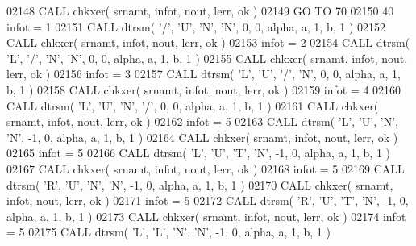 \begin{DoxyCode}
02148       \textcolor{keyword}{CALL }chkxer( srnamt, infot, nout, lerr, ok )
02149       \textcolor{keywordflow}{GO TO} 70
02150    40 infot = 1
02151       \textcolor{keyword}{CALL }dtrsm( \textcolor{stringliteral}{'/'}, \textcolor{stringliteral}{'U'}, \textcolor{stringliteral}{'N'}, \textcolor{stringliteral}{'N'}, 0, 0, alpha, a, 1, b, 1 )
02152       \textcolor{keyword}{CALL }chkxer( srnamt, infot, nout, lerr, ok )
02153       infot = 2
02154       \textcolor{keyword}{CALL }dtrsm( \textcolor{stringliteral}{'L'}, \textcolor{stringliteral}{'/'}, \textcolor{stringliteral}{'N'}, \textcolor{stringliteral}{'N'}, 0, 0, alpha, a, 1, b, 1 )
02155       \textcolor{keyword}{CALL }chkxer( srnamt, infot, nout, lerr, ok )
02156       infot = 3
02157       \textcolor{keyword}{CALL }dtrsm( \textcolor{stringliteral}{'L'}, \textcolor{stringliteral}{'U'}, \textcolor{stringliteral}{'/'}, \textcolor{stringliteral}{'N'}, 0, 0, alpha, a, 1, b, 1 )
02158       \textcolor{keyword}{CALL }chkxer( srnamt, infot, nout, lerr, ok )
02159       infot = 4
02160       \textcolor{keyword}{CALL }dtrsm( \textcolor{stringliteral}{'L'}, \textcolor{stringliteral}{'U'}, \textcolor{stringliteral}{'N'}, \textcolor{stringliteral}{'/'}, 0, 0, alpha, a, 1, b, 1 )
02161       \textcolor{keyword}{CALL }chkxer( srnamt, infot, nout, lerr, ok )
02162       infot = 5
02163       \textcolor{keyword}{CALL }dtrsm( \textcolor{stringliteral}{'L'}, \textcolor{stringliteral}{'U'}, \textcolor{stringliteral}{'N'}, \textcolor{stringliteral}{'N'}, -1, 0, alpha, a, 1, b, 1 )
02164       \textcolor{keyword}{CALL }chkxer( srnamt, infot, nout, lerr, ok )
02165       infot = 5
02166       \textcolor{keyword}{CALL }dtrsm( \textcolor{stringliteral}{'L'}, \textcolor{stringliteral}{'U'}, \textcolor{stringliteral}{'T'}, \textcolor{stringliteral}{'N'}, -1, 0, alpha, a, 1, b, 1 )
02167       \textcolor{keyword}{CALL }chkxer( srnamt, infot, nout, lerr, ok )
02168       infot = 5
02169       \textcolor{keyword}{CALL }dtrsm( \textcolor{stringliteral}{'R'}, \textcolor{stringliteral}{'U'}, \textcolor{stringliteral}{'N'}, \textcolor{stringliteral}{'N'}, -1, 0, alpha, a, 1, b, 1 )
02170       \textcolor{keyword}{CALL }chkxer( srnamt, infot, nout, lerr, ok )
02171       infot = 5
02172       \textcolor{keyword}{CALL }dtrsm( \textcolor{stringliteral}{'R'}, \textcolor{stringliteral}{'U'}, \textcolor{stringliteral}{'T'}, \textcolor{stringliteral}{'N'}, -1, 0, alpha, a, 1, b, 1 )
02173       \textcolor{keyword}{CALL }chkxer( srnamt, infot, nout, lerr, ok )
02174       infot = 5
02175       \textcolor{keyword}{CALL }dtrsm( \textcolor{stringliteral}{'L'}, \textcolor{stringliteral}{'L'}, \textcolor{stringliteral}{'N'}, \textcolor{stringliteral}{'N'}, -1, 0, alpha, a, 1, b, 1 )

\end{DoxyCode}
